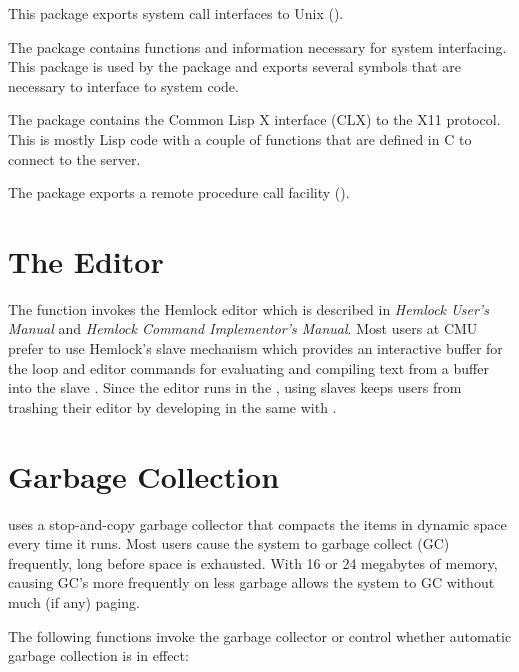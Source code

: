 \begin{Lentry}
\item[\code{unix}] This package exports system call
  interfaces to Unix ().
  
\item[\code{system (sys)}] The  package contains
  functions and information necessary for system interfacing.  This
  package is used by the  package and exports several
  symbols that are necessary to interface to system code.
  
\item[\code{xlib}] The  package contains the Common Lisp X
  interface (CLX) to the X11 protocol.  This is mostly Lisp code with
  a couple of functions that are defined in C to connect to the
  server.
  
\item[\code{wire}] The  package exports a remote procedure
  call facility ().
\end{Lentry}






\section{The Editor}

The  function invokes the Hemlock editor which is described
in {\it Hemlock User's Manual} and {\it Hemlock Command Implementor's
Manual}. Most users at CMU prefer to use Hemlock's slave \llisp{}
mechanism which provides an interactive buffer for the
 loop and editor commands for evaluating and
compiling text from a buffer into the slave \llisp.  Since the editor
runs in the \llisp, using slaves keeps users from trashing their
editor by developing in the same \llisp{} with \hemlock{}.


\section{Garbage Collection}

\cmucl{} uses a stop-and-copy garbage collector that compacts
the items in dynamic space every time it runs. Most users cause the
system to garbage collect (GC) frequently, long before space is
exhausted. With 16 or 24 megabytes of memory, causing GC's more
frequently on less garbage allows the system to GC without much (if
any) paging.

The following functions invoke the garbage collector or control whether
automatic garbage collection is in effect:

